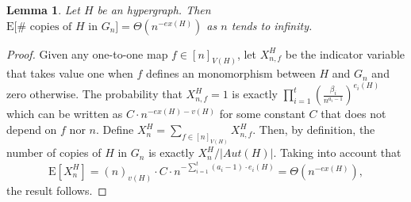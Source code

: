 \documentclass[12pt,notitlepage,a4paper]{article}
\newtheorem{lemma}{Lemma}[section]
\theoremstyle{definition}
\newcommand{\N}{\mathbb{N}}
\newcommand{\Ln}{\lim\limits_{n\to \infty}}
\newcommand{\overbar}[1]{\mkern 1.5mu\overline{\mkern-1.5mu#1\mkern-1.5mu}\mkern 1.5mu}
\begin{document}
\begin{lemma}
	Let $H$ be an hypergraph. Then 
	$\mathrm{E}\big[\# \text{ copies of }H \text{ in } G_n\big]=
	\Theta(n^{-ex(H)})$ as $n$ tends to infinity.  
\end{lemma}
\begin{proof}
Given any one-to-one map $f\in [n]_{V(H)}$, let $X^H_{n,f}$ be 
the indicator variable
that takes value one when $f$ defines an monomorphism 
between $H$ and $G_n$ and zero otherwise. 
The probability that $X^H_{n,f}=1$ is exactly
$\prod_{i=1}^t \left(\frac{\beta_i}{n^{a_i-1}}\right)^{e_i(H)}$ which can
be written as $C\cdot n^{-ex(H)-v(H)}$ for some constant
$C$ that does not depend on $f$ nor $n$. Define 
$X^H_n=\sum_{f\in [n]_{V(H)}} X^H_{n,f}$. Then, by definition, the number of 
copies of $H$ in $G_n$ is exactly $X^H_n/|Aut(H)|$.
Taking into account that 
\[
\mathrm{E}[X^H_n]=(n)_{v(H)} \cdot C\cdot n^{-\sum_{i=1}^t (a_i-1)\cdot e_i(H)}= \Theta(n^{-ex(H)}),
\]
the result follows. 
\end{proof}
\end{document}
